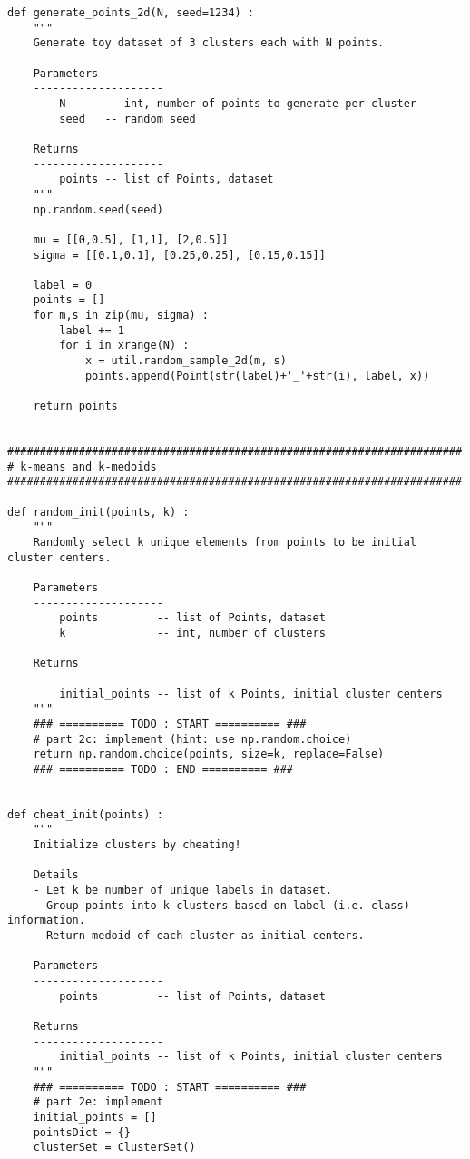\documentclass[11pt]{article}
\begin{document}
\begin{verbatim}
def generate_points_2d(N, seed=1234) :
    """
    Generate toy dataset of 3 clusters each with N points.
    
    Parameters
    --------------------
        N      -- int, number of points to generate per cluster
        seed   -- random seed
    
    Returns
    --------------------
        points -- list of Points, dataset
    """
    np.random.seed(seed)
    
    mu = [[0,0.5], [1,1], [2,0.5]]
    sigma = [[0.1,0.1], [0.25,0.25], [0.15,0.15]]
    
    label = 0
    points = []
    for m,s in zip(mu, sigma) :
        label += 1
        for i in xrange(N) :
            x = util.random_sample_2d(m, s)
            points.append(Point(str(label)+'_'+str(i), label, x))
    
    return points


######################################################################
# k-means and k-medoids
######################################################################

def random_init(points, k) :
    """
    Randomly select k unique elements from points to be initial cluster centers.
    
    Parameters
    --------------------
        points         -- list of Points, dataset
        k              -- int, number of clusters
    
    Returns
    --------------------
        initial_points -- list of k Points, initial cluster centers
    """
    ### ========== TODO : START ========== ###
    # part 2c: implement (hint: use np.random.choice)
    return np.random.choice(points, size=k, replace=False)
    ### ========== TODO : END ========== ###


def cheat_init(points) :
    """
    Initialize clusters by cheating!
    
    Details
    - Let k be number of unique labels in dataset.
    - Group points into k clusters based on label (i.e. class) information.
    - Return medoid of each cluster as initial centers.
    
    Parameters
    --------------------
        points         -- list of Points, dataset
    
    Returns
    --------------------
        initial_points -- list of k Points, initial cluster centers
    """
    ### ========== TODO : START ========== ###
    # part 2e: implement
    initial_points = []
    pointsDict = {}
    clusterSet = ClusterSet()


\end{verbatim}
\end{document}
